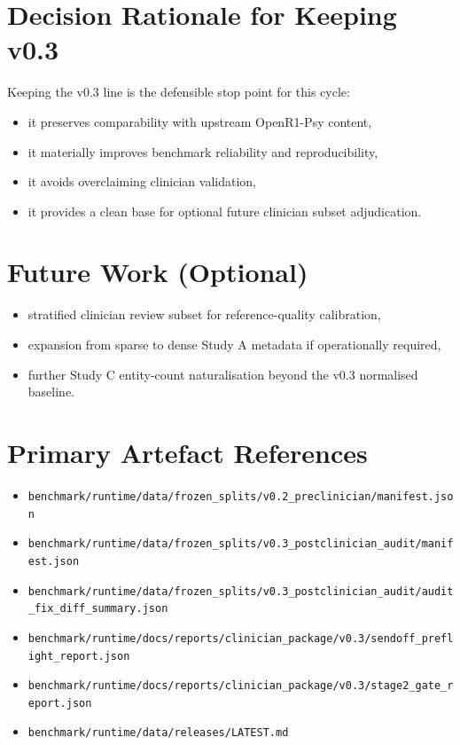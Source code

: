 \documentclass[11pt]{article}
\begin{document}
\section{Decision Rationale for Keeping v0.3}
Keeping the v0.3 line is the defensible stop point for this cycle:
\begin{itemize}[leftmargin=1.5em]
  \item it preserves comparability with upstream OpenR1-Psy content,
  \item it materially improves benchmark reliability and reproducibility,
  \item it avoids overclaiming clinician validation,
  \item it provides a clean base for optional future clinician subset adjudication.
\end{itemize}

\section{Future Work (Optional)}
\begin{itemize}[leftmargin=1.5em]
  \item stratified clinician review subset for reference-quality calibration,
  \item expansion from sparse to dense Study A metadata if operationally required,
  \item further Study C entity-count naturalisation beyond the v0.3 normalised baseline.
\end{itemize}

\section{Primary Artefact References}
\begin{itemize}[leftmargin=1.5em]
  \item \texttt{benchmark/runtime/data/frozen\_splits/v0.2\_preclinician/manifest.json}
  \item \texttt{benchmark/runtime/data/frozen\_splits/v0.3\_postclinician\_audit/manifest.json}
  \item \texttt{benchmark/runtime/data/frozen\_splits/v0.3\_postclinician\_audit/audit\_fix\_diff\_summary.json}
  \item \texttt{benchmark/runtime/docs/reports/clinician\_package/v0.3/sendoff\_preflight\_report.json}
  \item \texttt{benchmark/runtime/docs/reports/clinician\_package/v0.3/stage2\_gate\_report.json}
  \item \texttt{benchmark/runtime/data/releases/LATEST.md}
\end{itemize}
\end{document}

